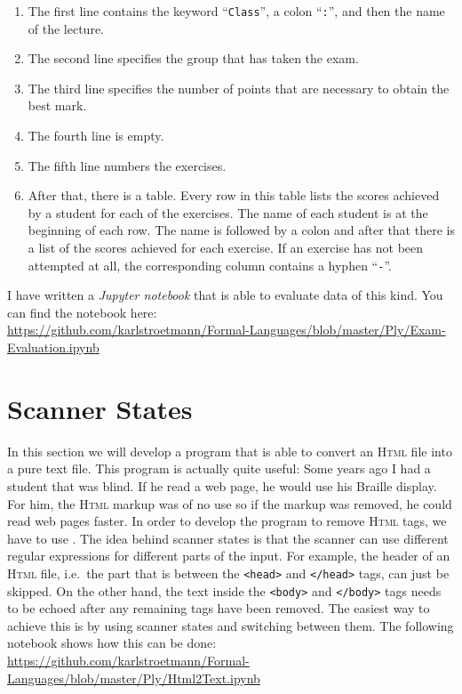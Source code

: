 
\begin{enumerate}
\item The first line contains the keyword ``\texttt{Class}'', a colon ``\texttt{:}'', and then the
      name of the lecture. 
\item The second line specifies the group that has taken the exam.
\item The third line specifies the number of points that are necessary to obtain the best mark.
\item The fourth line is empty.
\item The fifth line numbers the exercises.
\item After that, there is a table.  Every row in this table lists the scores achieved by a student
      for each of the exercises.  The name of each student is at the beginning of each row.  The
      name is followed by a colon and after that there is a list of the scores achieved for each
      exercise.  If an exercise has not been attempted at all, the corresponding column contains a hyphen
      ``\texttt{-}''.
\end{enumerate}
I have written a \textsl{Jupyter notebook} that is able to evaluate data of this kind.
You can find the notebook here:
\\[0.2cm]
\hspace*{1.3cm}
\href{https://github.com/karlstroetmann/Formal-Languages/blob/master/Ply/Exam-Evaluation.ipynb}{https://github.com/karlstroetmann/Formal-Languages/blob/master/Ply/Exam-Evaluation.ipynb}

\section{Scanner States}
In this section we will develop a program that is able to convert an 
\textsc{Html} file into a pure text file.  This program is actually quite useful: Some years ago I
had a student that was blind.  If he read a web page, he would use his Braille display.  For him,
the \textsc{Html} markup was of no use so if the markup was removed, he could read web pages faster.
In order to develop the program to remove \textsc{Html} tags, we have to use 
.  The idea behind scanner states is that the scanner can use different regular
expressions for different parts of the input.  For example, the header of an \textsc{Html} file, i.e.~the part
that is between the \texttt{<head>} and \texttt{</head>} tags, can just be
skipped.  On the other hand, the text inside the \texttt{<body>} and \texttt{</body>} tags needs to be echoed
after any remaining tags have been removed.  The easiest way to achieve this is by using scanner states and
switching between them.  The following notebook shows how this can be done:
\\[0.2cm]
\hspace*{1.3cm}
\href{https://github.com/karlstroetmann/Formal-Languages/blob/master/Ply/Html2Text.ipynb}{https://github.com/karlstroetmann/Formal-Languages/blob/master/Ply/Html2Text.ipynb}
\\

